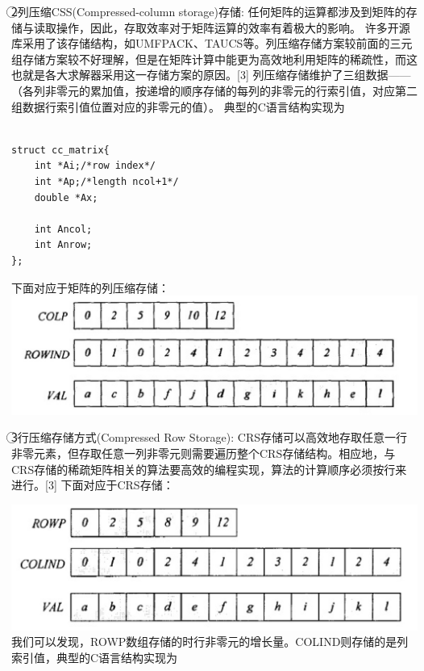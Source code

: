 \documentclass{article}
\begin{document}
\textcircled{2}列压缩CSS(Compressed-column storage)存储:
任何矩阵的运算都涉及到矩阵的存储与读取操作，因此，存取效率对于矩阵运算的效率有着极大的影响。\newline
许多开源库采用了该存储结构，如UMFPACK、TAUCS等。列压缩存储方案较前面的三元组存储方案较不好理解，但是在矩阵计算中能更为高效地利用矩阵的稀疏性，而这也就是各大求解器采用这一存储方案的原因。[3]
\newline
列压缩存储维护了三组数据——（各列非零元的累加值，按递增的顺序存储的每列的非零元的行索引值，对应第二组数据行索引值位置对应的非零元的值）。
典型的C语言结构实现为\newline
\begin{lstlisting}

struct cc_matrix{ 
	int *Ai;/*row index*/ 
	int *Ap;/*length ncol+1*/
	double *Ax;
	
	int Ancol;
	int Anrow;
};

\end{lstlisting}
下面对应于矩阵的列压缩存储：
\newline\newline\newline\newline\newline
\includegraphics[scale=0.25]{ccmatrix.png}

\textcircled{3}行压缩存储方式(Compressed Row Storage):
CRS存储可以高效地存取任意一行非零元素，但存取任意一列非零元则需要遍历整个CRS存储结构。相应地，与CRS存储的稀疏矩阵相关的算法要高效的编程实现，算法的计算顺序必须按行来进行。[3]
下面对应于CRS存储：
\newline\newline\newline\newline\newline

\includegraphics[scale=0.25]{crs.png}
我们可以发现，ROWP数组存储的时行非零元的增长量。COLIND则存储的是列索引值，典型的C语言结构实现为\newline
\end{document}

